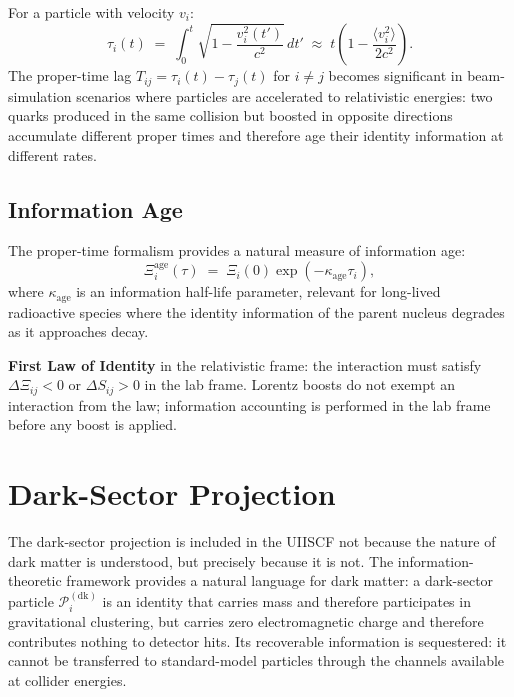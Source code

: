 \documentclass[11pt,a4paper]{article}
\newcommand{\Pid}{\mathscr{P}}
\newcommand{\Rec}{\Xi}
\begin{document}
For a particle with velocity $v_i$:
\[
  \tau_i(t) \;=\; \int_0^t
    \sqrt{1 - \frac{v_i^2(t')}{c^2}} \, dt'
  \;\approx\;
  t \left(1 - \frac{\langle v_i^2 \rangle}{2c^2}\right) .
\]
The proper-time lag $T_{ij} = \tau_i(t) - \tau_j(t)$ for $i \neq j$
becomes significant in beam-simulation scenarios where particles are
accelerated to relativistic energies: two quarks produced in the same
collision but boosted in opposite directions accumulate different proper
times and therefore age their identity information at different rates.

\subsection{Information Age}

The proper-time formalism provides a natural measure of information age:
\[
  \Rec_i^{\mathrm{age}}(\tau) \;=\;
  \Rec_i(0) \exp(-\kappa_{\mathrm{age}} \tau_i) ,
\]
where $\kappa_{\mathrm{age}}$ is an information half-life parameter, relevant
for long-lived radioactive species where the identity information of the
parent nucleus degrades as it approaches decay.

\begin{smlaw}
\textbf{First Law of Identity} in the relativistic frame: the interaction
must satisfy $\Delta\Rec_{ij} < 0$ or $\Delta S_{ij} > 0$ in the lab frame.
Lorentz boosts do not exempt an interaction from the law; information
accounting is performed in the lab frame before any boost is applied.
\end{smlaw}

\section{Dark-Sector Projection}\label{sec:dark}

The dark-sector projection is included in the UIISCF not because the nature
of dark matter is understood, but precisely because it is not.  The
information-theoretic framework provides a natural language for dark matter:
a dark-sector particle $\Pid_i^{(\mathrm{dk})}$ is an identity that carries
mass and therefore participates in gravitational clustering, but carries
zero electromagnetic charge and therefore contributes nothing to detector
hits.  Its recoverable information is sequestered: it cannot be transferred
to standard-model particles through the channels available at collider
energies.
\end{document}
